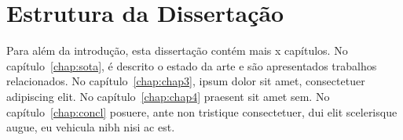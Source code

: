 \section{Estrutura da Dissertação} \label{sec:struct}

Para além da introdução, esta dissertação contém mais x capítulos.
No capítulo~\ref{chap:sota}, é descrito o estado da arte e são
apresentados trabalhos relacionados. 
No capítulo~\ref{chap:chap3}, ipsum dolor sit amet, consectetuer
adipiscing elit.
No capítulo~\ref{chap:chap4} praesent sit amet sem. 
No capítulo~\ref{chap:concl}  posuere, ante non tristique
consectetuer, dui elit scelerisque augue, eu vehicula nibh nisi ac
est. 
